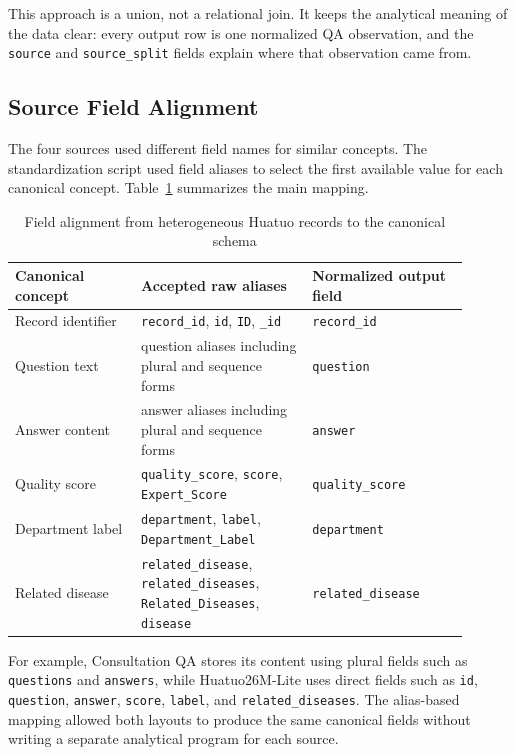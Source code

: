 \documentclass[12pt,a4paper]{article}
\begin{document}
This approach is a union, not a relational join. It keeps the analytical meaning of the data clear: every output row is one normalized QA observation, and the \texttt{source} and \texttt{source\_split} fields explain where that observation came from.

\subsection{Source Field Alignment}

The four sources used different field names for similar concepts. The standardization script used field aliases to select the first available value for each canonical concept. Table~\ref{tab:field-alignment} summarizes the main mapping.

\begin{table}[H]
\centering
\small
\caption{Field alignment from heterogeneous Huatuo records to the canonical schema}
\label{tab:field-alignment}
\begin{tabular}{p{0.25\linewidth}p{0.34\linewidth}p{0.31\linewidth}}
\toprule
Canonical concept & Accepted raw aliases & Normalized output field \\
\midrule
Record identifier & \texttt{record\_id}, \texttt{id}, \texttt{ID}, \texttt{\_id} & \texttt{record\_id} \\
Question text & question aliases including plural and sequence forms & \texttt{question} \\
Answer content & answer aliases including plural and sequence forms & \texttt{answer} \\
Quality score & \texttt{quality\_score}, \texttt{score}, \texttt{Expert\_Score} & \texttt{quality\_score} \\
Department label & \texttt{department}, \texttt{label}, \texttt{Department\_Label} & \texttt{department} \\
Related disease & \texttt{related\_disease}, \texttt{related\_diseases}, \texttt{Related\_Diseases}, \texttt{disease} & \texttt{related\_disease} \\
\bottomrule
\end{tabular}
\end{table}

For example, Consultation QA stores its content using plural fields such as \texttt{questions} and \texttt{answers}, while Huatuo26M-Lite uses direct fields such as \texttt{id}, \texttt{question}, \texttt{answer}, \texttt{score}, \texttt{label}, and \texttt{related\_diseases}. The alias-based mapping allowed both layouts to produce the same canonical fields without writing a separate analytical program for each source.
\end{document}

